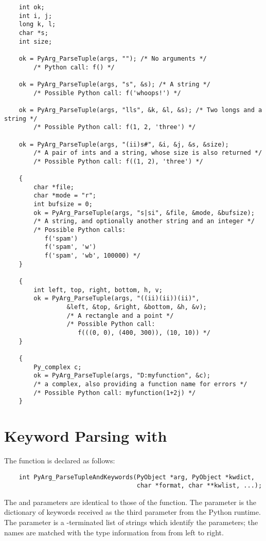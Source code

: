 \documentclass[twoside,openright]{report}
\begin{document}
\begin{verbatim}
    int ok;
    int i, j;
    long k, l;
    char *s;
    int size;

    ok = PyArg_ParseTuple(args, ""); /* No arguments */
        /* Python call: f() */

    ok = PyArg_ParseTuple(args, "s", &s); /* A string */
        /* Possible Python call: f('whoops!') */

    ok = PyArg_ParseTuple(args, "lls", &k, &l, &s); /* Two longs and a string */
        /* Possible Python call: f(1, 2, 'three') */

    ok = PyArg_ParseTuple(args, "(ii)s#", &i, &j, &s, &size);
        /* A pair of ints and a string, whose size is also returned */
        /* Possible Python call: f((1, 2), 'three') */

    {
        char *file;
        char *mode = "r";
        int bufsize = 0;
        ok = PyArg_ParseTuple(args, "s|si", &file, &mode, &bufsize);
        /* A string, and optionally another string and an integer */
        /* Possible Python calls:
           f('spam')
           f('spam', 'w')
           f('spam', 'wb', 100000) */
    }

    {
        int left, top, right, bottom, h, v;
        ok = PyArg_ParseTuple(args, "((ii)(ii))(ii)",
                 &left, &top, &right, &bottom, &h, &v);
                 /* A rectangle and a point */
                 /* Possible Python call:
                    f(((0, 0), (400, 300)), (10, 10)) */
    }

    {
        Py_complex c;
        ok = PyArg_ParseTuple(args, "D:myfunction", &c);
        /* a complex, also providing a function name for errors */
        /* Possible Python call: myfunction(1+2j) */
    }
\end{verbatim}


\section{Keyword Parsing with }

The  function is declared as
follows:

\bcode\begin{verbatim}
    int PyArg_ParseTupleAndKeywords(PyObject *arg, PyObject *kwdict,
                                    char *format, char **kwlist, ...);
\end{verbatim}\ecode

The  and  parameters are identical to those of the
 function.  The  parameter
is the dictionary of keywords received as the third parameter from the 
Python runtime.  The  parameter is a \NULL{}-terminated
list of strings which identify the parameters; the names are matched
with the type information from  from left to right.
\end{document}
